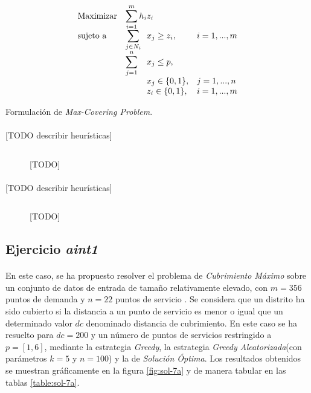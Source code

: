 \documentclass[spanish]{article}
\begin{document}
		\begin{eqfloat}
			\begin{equation}
				\begin{array}{ll@{}ll}
					\text{Maximizar}
						& \displaystyle\sum\limits_{i = 1}^{m} h_{i} & z_{i} 			&							\\
					\text{sujeto a}
						& \displaystyle\sum\limits_{j \in N_i}& x_{j} \geq z_i,		&i=1 ,..., m	\\
						& \displaystyle\sum\limits_{j = 1}^n 	& x_{j} \leq p,  		& 						\\
						&                                     &	x_{j} \in \{0,1\},&j=1 ,..., n 	\\
						&                                     &	z_{i} \in \{0,1\},&i=1 ,..., m  \\
				\end{array}
			\end{equation}
			\caption{Formulación de \emph{Max-Covering Problem}.}
			\label{eq:max_covering}
		\end{eqfloat}

		\paragraph{}
		[TODO describir heurísticas]

		\begin{figure}[H]
			\centering
			\inputminted{basic}{./code/set-covering-greedy.mos}
			\caption{[TODO]}
			\label{}
		\end{figure}

		\paragraph{}
		[TODO describir heurísticas]

		\begin{figure}[H]
			\centering
			\inputminted{basic}{./code/random-greedy.mos}
			\caption{[TODO]}
			\label{}
		\end{figure}

		\subsection{Ejercicio \emph{aint1}}
		\label{sec:e-7a}

			\paragraph{}
			En este caso, se ha propuesto resolver el problema de \emph{Cubrimiento Máximo} sobre un conjunto de datos de entrada de tamaño relativamente elevado, con $m = 356$ puntos de demanda y $n=22$ puntos de servicio . Se considera que un distrito ha sido cubierto si la distancia a un punto de servicio es menor o igual que un determinado valor $dc$ denominado distancia de cubrimiento. En este caso se ha resuelto para $dc = 200$ y un número de puntos de servicios restringido a $p = [1,6]$, mediante la estrategia \emph{Greedy}, la estrategia \emph{Greedy Aleatorizada}(con parámetros $k=5$ y $n=100$) y la de \emph{Solución Óptima}. Los resultados obtenidos se muestran gráficamente en la figura \ref{fig:sol-7a} y de manera tabular en las tablas \ref{table:sol-7a}.
\end{document}
